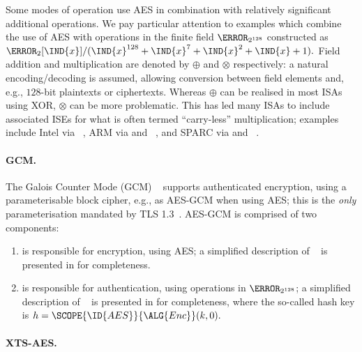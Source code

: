 Some modes of operation use AES in combination with relatively
  significant 
additional operations.  
We pay particular attention to examples which combine the use of AES with
operations in the finite field $\F_{2^{128}}$ constructed as
$
\F_{2}[\IND{x}] / ( \IND{x}^{128} + \IND{x}^{7} + \IND{x}^{2} + \IND{x} + 1 ) .
$
Field 
      addition
and
multiplication
are denoted by
$\oplus$
and
$\otimes$
respectively:
a natural encoding/decoding is assumed, allowing conversion between field 
elements and, e.g., $128$-bit plaintexts or ciphertexts.
Whereas $\oplus$ can be realised in most ISAs using XOR, $\otimes$ can be
more problematic.  This has led many ISAs to include associated ISEs for
what is often termed ``carry-less'' multiplication; 
examples include
Intel via ~\cite[Page 4-241]{X86:2:18},
ARM   via  and ~\cite[Section C7.2.215]{ARMv8-A:20},
and
SPARC via  and ~\cite[Section 7.143]{SPARC:16}.

\paragraph{GCM.}

The Galois Counter Mode (GCM)
~\cite{NIST:sp.800.38d}
supports authenticated encryption, using a parameterisable block cipher,
e.g., as AES-GCM when using AES; this is the {\em only} parameterisation
mandated by TLS 1.3~\cite[Section 9.1]{rfc:8446}.
AES-GCM is comprised of two components:

\begin{enumerate}

\item {}
      is responsible for 
          encryption,
      using AES; 
      a simplified description of
      ~\cite[Algorithm 3]{NIST:sp.800.38d}
      is presented in
      for completeness.

\item {}
      is responsible for
      authentication,
      using operations in $\F_{2^{128}}$;
      a simplified description of
      ~\cite[Algorithm 2]{NIST:sp.800.38d}
      is presented in
      for completeness,
      where the so-called hash key is
      $
      h = \SCOPE{\ID{AES}}{\ALG{Enc}}( k, 0 ) .
      $

\end{enumerate}

\paragraph{XTS-AES.}

